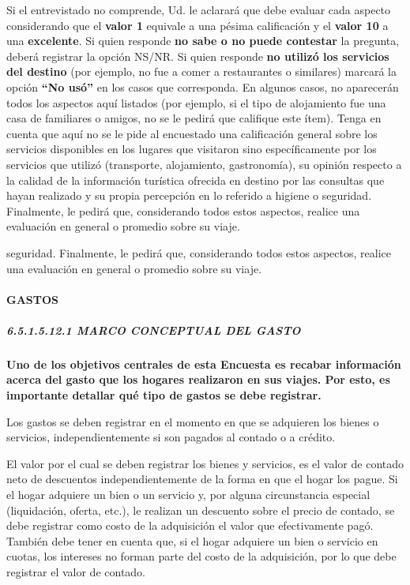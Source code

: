\documentclass[
  openany]{book}
\begin{document}
Si el entrevistado no comprende, Ud. le aclarará que debe evaluar cada aspecto considerando que el \textbf{valor 1} equivale a una pésima calificación y el \textbf{valor 10} a una \textbf{excelente}. Si quien responde \textbf{no sabe o no puede contestar} la pregunta, deberá registrar la opción NS/NR. Si quien responde \textbf{no utilizó los servicios del destino} (por ejemplo, no fue a comer a restaurantes o similares) marcará la opción \textbf{``No usó''} en los casos que corresponda. En algunos casos, no aparecerán todos los aspectos aquí listados (por ejemplo, si el tipo de alojamiento fue una casa de familiares o amigos, no se le pedirá que califique este ítem). Tenga en cuenta que aquí no se le pide al encuestado una calificación general sobre los servicios disponibles en los lugares que visitaron sino específicamente por los servicios que utilizó (transporte, alojamiento, gastronomía), su opinión respecto a la calidad de la información turística ofrecida en destino por las consultas que hayan realizado y su propia percepción en lo referido a higiene o seguridad. Finalmente, le pedirá que, considerando todos estos aspectos, realice una evaluación en general o promedio sobre su viaje.

seguridad. Finalmente, le pedirá que, considerando todos estos aspectos, realice una evaluación en general o promedio sobre su viaje.

\hypertarget{gastos}{%
\paragraph{\texorpdfstring{\textbf{GASTOS}}{GASTOS}}\label{gastos}}

\hypertarget{marco-conceptual-del-gasto}{%
\subparagraph{\texorpdfstring{\textbf{6.5.1.5.12.1 MARCO CONCEPTUAL DEL GASTO}}{6.5.1.5.12.1 MARCO CONCEPTUAL DEL GASTO}}\label{marco-conceptual-del-gasto}}

\textbf{Uno de los objetivos centrales de esta Encuesta es recabar información acerca del gasto que los hogares realizaron en sus viajes. Por esto, es importante detallar qué tipo de gastos se debe registrar.}

Los gastos se deben registrar en el momento en que se adquieren los bienes o servicios, independientemente si son pagados al contado o a crédito.

El valor por el cual se deben registrar los bienes y servicios, es el valor de contado neto de descuentos independientemente de la forma en que el hogar los pague. Si el hogar adquiere un bien o un servicio y, por alguna circunstancia especial (liquidación, oferta, etc.), le realizan un descuento sobre el precio de contado, se debe registrar como costo de la adquisición el valor que efectivamente pagó. También debe tener en cuenta que, si el hogar adquiere un bien o servicio en cuotas, los intereses no forman parte del costo de la adquisición, por lo que debe registrar el valor de contado.
\end{document}
